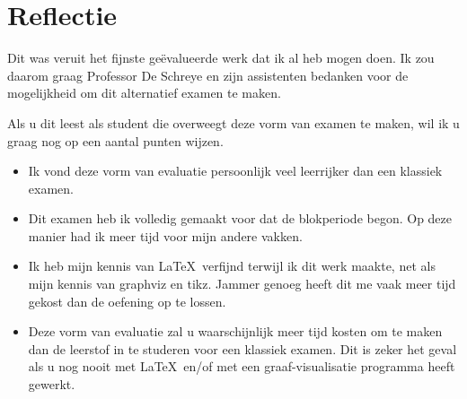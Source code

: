 \documentclass[alternative-exam.tex]{subfiles}
\begin{document}
\chapter*{Reflectie}
Dit was veruit het fijnste ge\"evalueerde werk dat ik al heb mogen doen. Ik zou daarom graag Professor De Schreye en zijn assistenten bedanken voor de mogelijkheid om dit alternatief examen te maken.

\noindent Als u dit leest als student die overweegt deze vorm van examen te maken, wil ik u graag nog op een aantal punten wijzen.
\begin{itemize}
\item Ik vond deze vorm van evaluatie persoonlijk veel leerrijker dan een klassiek examen.
\item Dit examen heb ik volledig gemaakt voor dat de blokperiode begon. Op deze manier had ik meer tijd voor mijn andere vakken.
\item Ik heb mijn kennis van \LaTeX\ verfijnd terwijl ik dit werk maakte, net als mijn kennis van graphviz en tikz. Jammer genoeg heeft dit me vaak meer tijd gekost dan de oefening op te lossen.
\item Deze vorm van evaluatie zal u waarschijnlijk meer tijd kosten om te maken dan de leerstof in te studeren voor een klassiek examen. Dit is zeker het geval als u nog nooit met \LaTeX\ en/of met een graaf-visualisatie programma heeft gewerkt.
\end{itemize}
\end{document}
